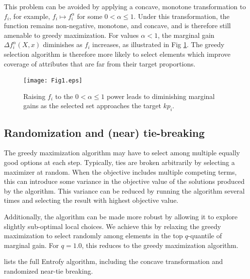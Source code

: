 \documentclass[10pt,letterpaper]{article}
\begin{document}
This problem can be avoided by applying a concave, monotone transformation to $f_i$, for example, $f_i \mapsto f_i^\alpha$ for some ${0 < \alpha \leq 1}$.
Under this transformation, the function remains non-negative, monotone, and concave, and is therefore still amenable to greedy maximization.
For values $\alpha < 1$, the marginal gain $\Delta f_i^\alpha(X, x)$ diminishes as $f_i$ increases, as illustrated in Fig \ref{fig:concave}.
The greedy selection algorithm is therefore more likely to select elements which improve coverage of attributes that are far from their target proportions.

\begin{figure}
\begin{center}
\texttt{[image: Fig1.eps]}
\caption{Raising $f_i$ to the $0 < \alpha \leq 1$ power leads to diminishing marginal gains as the selected set approaches the target $kp_i$.}
\label{fig:concave}
\end{center}
\end{figure}


\subsection*{Randomization and (near) tie-breaking}

The greedy maximization algorithm may have to select among multiple equally good options at each step.
Typically, ties are broken arbitrarily by selecting a maximizer at random.
When the objective includes multiple competing terms, this can introduce some variance in the objective value of the solutions produced by the algorithm.
This variance can be reduced by running the algorithm several times and selecting the result with highest objective value.

Additionally, the algorithm can be made more robust by allowing it to explore slightly sub-optimal local choices. We achieve this by relaxing the greedy maximization to select randomly among elements in the top $q$-quantile of marginal gain. For $q=1.0$, this reduces to the greedy maximization algorithm.

 lists the full Entrofy algorithm, including the concave transformation and randomized near-tie breaking.
\end{document}
